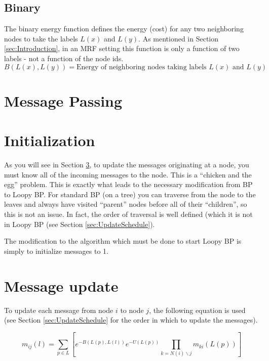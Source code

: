 \documentclass[a4paper,10pt]{article}
\begin{document}
\subsection{Binary}
\label{sec:EnergyFunctions:Binary}
The binary energy function defines the energy (cost) for any two neighboring nodes to take the labels $L(x)$ and $L(y)$. As mentioned in Section \ref{sec:Introduction}, in an MRF setting this function is only a function of two labels - not a function of the node ids.
\begin{equation}
 B(L(x),L(y)) = \mbox{Energy of neighboring nodes taking labels } L(x) \mbox{ and } L(y)
\end{equation}


\section{Message Passing}
\label{sec:MessagePassing}

\section{Initialization}
\label{sec:MessagePassing:Initialization}
As you will see in Section \ref{sec:MessageUpdate}, to update the messages originating at a node, you must know all of the incoming messages to the node. This is a ``chicken and the egg'' problem. This is exactly what leads to the necessary modification from BP to Loopy BP. For standard BP (on a tree) you can traverse from the node to the leaves and always have visited ``parent'' nodes before all of their ``children'', so this is not an issue. In fact, the order of traversal is well defined (which it is not in Loopy BP (see Section \ref{sec:UpdateSchedule}).

The modification to the algorithm which must be done to start Loopy BP is simply to initialize messages to 1.

\section{Message update}
\label{sec:MessageUpdate}
To update each message from node $i$ to node $j$, the following equation is used (see Section \ref{sec:UpdateSchedule} for the order in which to update the messages).

\begin{equation}
m_{ij}(l) = \sum_{p \in L} \left[ e^{-B(L(p), L(l))} e^{-U(L(p))} \prod_{k=N(i)\backslash j}  m_{ki}(L(p)) \right]
\end{equation}
\end{document}
